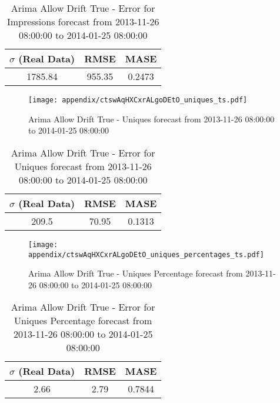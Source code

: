 \begin{table}[H]
\centering
\footnotesize
\begin{tabular}{ccc}
$\sigma$ (Real Data) & RMSE & MASE   \\ \hline
1785.84 & 955.35 & 0.2473 \\
\end{tabular}

\vspace{0.5cm}

\caption{
Arima Allow Drift True - Error for Impressions forecast from 2013-11-26 08:00:00 to 2014-01-25 08:00:00}
\end{table}

\begin{figure}[H] \begin{center} \leavevmode
\texttt{[image: appendix/ctswAqHXCxrALgoDEtO\_uniques\_ts.pdf]} \caption{
Arima Allow Drift True - Uniques forecast from 2013-11-26 08:00:00 to 2014-01-25 08:00:00} \label{fig:appendix/ctswAqHXCxrALgoDEtO_uniques_ts.pdf} \end{center}
\end{figure}

\begin{table}[H]
\centering
\footnotesize
\begin{tabular}{ccc}
$\sigma$ (Real Data) & RMSE & MASE   \\ \hline
209.5 & 70.95 & 0.1313 \\
\end{tabular}

\vspace{0.5cm}

\caption{
Arima Allow Drift True - Error for Uniques forecast from 2013-11-26 08:00:00 to 2014-01-25 08:00:00}
\end{table}

\begin{figure}[H] \begin{center} \leavevmode
\texttt{[image: appendix/ctswAqHXCxrALgoDEtO\_uniques\_percentages\_ts.pdf]} \caption{
Arima Allow Drift True - Uniques Percentage forecast from 2013-11-26 08:00:00 to 2014-01-25 08:00:00} \label{fig:appendix/ctswAqHXCxrALgoDEtO_uniques_percentages_ts.pdf} \end{center}
\end{figure}

\begin{table}[H]
\centering
\footnotesize
\begin{tabular}{ccc}
$\sigma$ (Real Data) & RMSE & MASE   \\ \hline
2.66 & 2.79 & 0.7844 \\
\end{tabular}

\vspace{0.5cm}

\caption{
Arima Allow Drift True - Error for Uniques Percentage forecast from 2013-11-26 08:00:00 to 2014-01-25 08:00:00}
\end{table}

